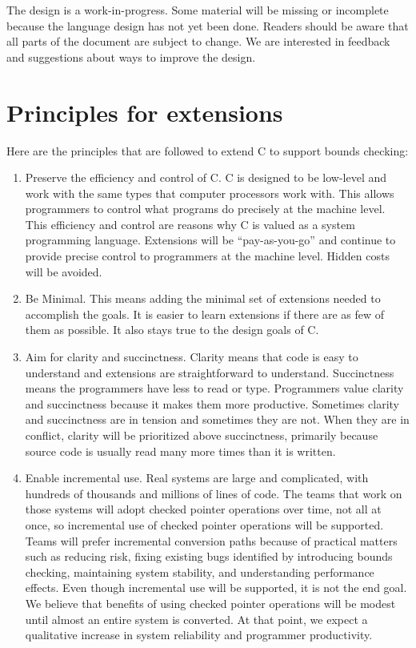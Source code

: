 The design is a work-in-progress.  Some material will be missing
or incomplete because the language design has not yet been done.
Readers should be aware that all parts of the document are subject to change. 
We are interested in feedback and suggestions about ways to improve
the design.

\section{Principles for extensions}
\label{chapter:principles}

Here are the principles that are followed to extend C to support bounds checking:

\begin{enumerate}
\item
  Preserve the efficiency and control of C. C is designed to be
  low-level and work with the same types that computer processors work
  with. This allows programmers to
  control what programs do precisely at the
  machine level. This efficiency and control are reasons why C is valued as a
  system programming language. Extensions will be ``pay-as-you-go'' and
  continue to provide precise control to programmers at the machine
  level. Hidden costs will be avoided.
\item
  Be Minimal. This means adding the minimal set of extensions needed to
  accomplish the goals. It is easier to learn extensions if there are as
  few of them as possible. It also stays true to the design goals
  of C.
\item
  Aim for clarity and succinctness. Clarity means that code is easy to
  understand and extensions are straightforward to understand.
  Succinctness means the programmers have less to read or type.
  Programmers value clarity and succinctness because it makes them more
  productive.  Sometimes clarity and succinctness are in
  tension and sometimes they are not. When they are in conflict, clarity
  will be prioritized above succinctness, primarily because source code
  is usually read many more times than it is written.
\item
  Enable incremental use. Real systems are large and complicated, with
  hundreds of thousands and millions of lines of code. The teams that
  work on those systems will adopt checked pointer operations over time,
  not all at once, so incremental use of checked pointer operations will be
  supported. Teams will prefer incremental conversion paths because of
  practical matters such as reducing risk, fixing existing bugs
  identified by introducing bounds checking, maintaining system
  stability, and understanding performance effects. Even though
  incremental use will be supported, it is not the end goal. We believe
  that benefits of using checked pointer operations will be modest until
  almost an entire system is converted. At that point, we expect a
  qualitative increase in system reliability and programmer
  productivity.
\end{enumerate}

